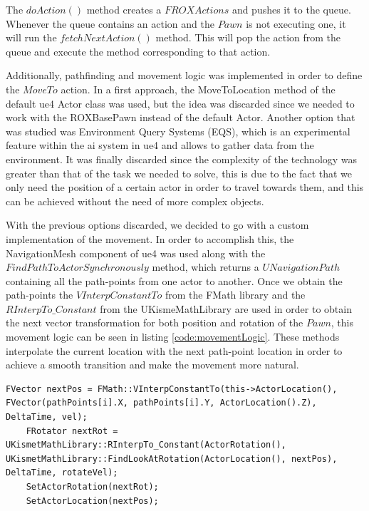The $doAction()$ method creates a $FROXActions$ and pushes it to the queue. Whenever the queue contains an action and the $Pawn$ is not executing one, it will run the $fetchNextAction()$ method. This will pop the action from the queue and execute the method corresponding to that action.

Additionally, pathfinding and movement logic was implemented in order to define the $MoveTo$ action. In a first approach, the MoveToLocation method of the default \gls{ue4} Actor class was used, but the idea was discarded since we needed to work with the ROXBasePawn instead of the default Actor. Another option that was studied was Environment Query Systems (EQS), which is an experimental feature within the \gls{ai} system in \gls{ue4} and allows to gather data from the environment. It was finally discarded since the complexity of the technology was greater than that of the task we needed to solve, this is due to the fact that we only need the position of a certain actor in order to travel towards them, and this can be achieved without the need of more complex objects. 

With the previous options discarded, we decided to go with a custom implementation of the movement. In order to accomplish this, the NavigationMesh component of \gls{ue4} was used along with the $FindPathToActorSynchronously$ method, which returns a $UNavigationPath$ containing all the path-points from one actor to another. Once we obtain the path-points the $VInterpConstantTo$ from the FMath library and the $RInterpTo\_Constant$ from the UKismeMathLibrary are used in order to obtain the next vector transformation for both position and rotation of the $Pawn$, this movement logic can be seen in listing \ref{code:movementLogic}. These methods interpolate the current location with the next path-point location in order to achieve a smooth transition and make the movement more natural.

\begin{lstlisting}[style=C++, caption=Movement logic for the pathfinding algorithm, frame=single, label=code:movementLogic]
	FVector nextPos = FMath::VInterpConstantTo(this->ActorLocation(), FVector(pathPoints[i].X, pathPoints[i].Y, ActorLocation().Z), DeltaTime, vel);
	FRotator nextRot = UKismetMathLibrary::RInterpTo_Constant(ActorRotation(), UKismetMathLibrary::FindLookAtRotation(ActorLocation(), nextPos), DeltaTime, rotateVel);
	SetActorRotation(nextRot);
	SetActorLocation(nextPos);
\end{lstlisting}

